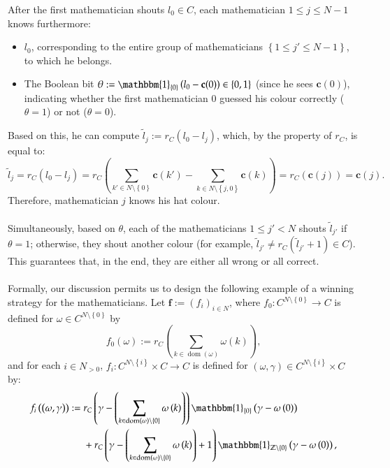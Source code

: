 \documentclass[11pt, a4paper, oneside]{article}
\theoremstyle{remark}
\theoremstyle{lemma}
\begin{document}
After the first mathematician shouts \(l_0 \in C\), each mathematician \(1 \leq j \leq N - 1\) knows furthermore:
\begin{itemize}
    \item \(l_0\), corresponding to the entire group of mathematicians \(\left\{ 1 \leq j' \leq N - 1 \right\}\), to which he belongs.
    \item The Boolean bit \(\theta := \mathbbm{1}_{\left\{ 0 \right\}}\left( l_0 - \mathbf{c}(0) \right) \in \left\{ 0, 1 \right\}\) (since he sees \(\mathbf{c}(0)\)), indicating whether the first mathematician \(0\) guessed his colour correctly (\(\theta = 1\)) or not (\(\theta = 0\)).
\end{itemize}
Based on this, he can compute \(\tilde{l}_j := r_{C}\left( l_0 - l_j \right)\), which, by the property of \(r_C\), is equal to:
\[
\tilde{l}_j = r_{C}\left( l_0 - l_j \right) = r_{C}\left( \sum_{k' \in N \setminus \left\{ 0 \right\}} \mathbf{c}(k') - \sum_{k \in N \setminus \left\{ j, 0 \right\}} \mathbf{c}(k) \right) = r_{C}\left( \mathbf{c}(j) \right) = \mathbf{c}(j).
\]
Therefore, mathematician \(j\) knows his hat colour.
\\\\
Simultaneously, based on \(\theta\), each of the mathematicians \(1 \leq j' < N\) shouts \(\tilde{l}_{j'}\) if \(\theta = 1\); otherwise, they shout another colour (for example, \(\tilde{l}_{j'} \neq r_{C}\left( \tilde{l}_{j'} + 1 \right) \in C\)). This guarantees that, in the end, they are either all wrong or all correct.
\\\\
Formally, our discussion permits us to design the following example of a winning strategy for the mathematicians. Let \(\mathbf{f} := \left( f_i \right)_{i \in N}\), where \(f_0 : C^{N \setminus \left\{ 0 \right\}} \rightarrow C\) is defined for \(\omega \in C^{N \setminus \left\{ 0 \right\}}\) by
\[
f_0\left( \omega \right) := r_{C}\left( \sum_{k \in \operatorname{dom}\left( \omega \right)} \omega\left( k \right) \right),
\]
and for each \(i \in N_{>0}\), \(f_i : C^{N \setminus \left\{ i \right\}} \times C \rightarrow C\) is defined for \(\left( \omega, \gamma \right) \in C^{N \setminus \left\{ i \right\}} \times C\) by:
\begin{align*}
f_i\left( \left( \omega, \gamma \right) \right) :=\;& 
r_{C} \left( \gamma - \left( \sum_{k \in \operatorname{dom}\left( \omega \right) \setminus \left\{ 0 \right\}} \omega\left( k \right) \right) \right) \mathbbm{1}_{\left\{ 0 \right\}}\left( \gamma - \omega\left( 0 \right) \right) \\
&+ r_{C} \left( \gamma - \left( \sum_{k \in \operatorname{dom}\left( \omega \right) \setminus \left\{ 0 \right\}} \omega\left( k \right) \right) + 1 \right) \mathbbm{1}_{\mathbb{Z} \setminus \left\{ 0 \right\}}\left( \gamma - \omega\left( 0 \right) \right),
\end{align*}
\end{document}
